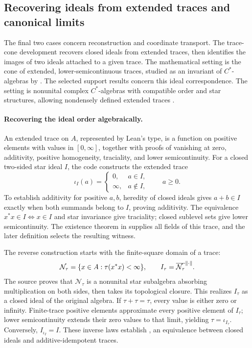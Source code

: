 \subsection{Recovering ideals from extended traces and canonical limits}
\label{sec:trace-ideals}

The final two cases concern reconstruction and coordinate transport. The trace-cone development recovers closed ideals from extended traces, then identifies the images of two ideals attached to a given trace. The mathematical setting is the cone of extended,
lower-semicontinuous traces, studied as an invariant of $C^*$-algebras by
\citet{ElliottRobertSantiago2011}. The selected support results concern this
ideal correspondence. The setting is nonunital complex $C^*$-algebras with compatible order and star structures, allowing nondensely defined extended traces \citep{OAITraceIdeals}.

\paragraph{Recovering the ideal order algebraically.}
An extended trace on $A$, represented by Lean's  type,
is a function on positive elements with values in
$[0,\infty]$, together with proofs of vanishing at zero, additivity, positive homogeneity,
traciality, and lower semicontinuity. For a closed two-sided star ideal $I$,
the code constructs the extended trace
\begin{equation}
  \iota_I(a)=
  \begin{cases}0,&a\in I,\\ \infty,&a\notin I,\end{cases}
  \qquad a\geq 0.
  \label{eq:ideal-weight}
\end{equation}
To establish additivity for positive $a,b$, heredity of closed ideals gives
$a+b\in I$ exactly when both summands belong to $I$, proving additivity.
The equivalence $x^*x\in I\Longleftrightarrow x\in I$ and star invariance
give traciality; closed sublevel sets give lower semicontinuity. The existence theorem in  supplies all fields of this trace, and the later definition selects the resulting witness.

The reverse construction starts with the finite-square domain of a trace:
\begin{equation}
  \mathcal N_\tau=\{x\in A:\tau(x^*x)<\infty\},
  \qquad I_\tau=\overline{\mathcal N_\tau}^{\lVert\cdot\rVert}.
  \label{eq:finite-ideal}
\end{equation}
The source proves that $\mathcal N_\tau$ is a nonunital star subalgebra
absorbing multiplication on both sides, then takes its topological
closure. This realizes $I_\tau$ as a closed ideal of the original algebra. If
$\tau+\tau=\tau$, every value is either zero or infinity.
Finite-trace positive elements approximate every positive element of
$I_\tau$; lower semicontinuity extends their zero values to that limit,
yielding $\tau=\iota_{I_\tau}$. Conversely,
$I_{\iota_I}=I$. These inverse laws establish
, an equivalence between closed ideals
and additive-idempotent traces.

